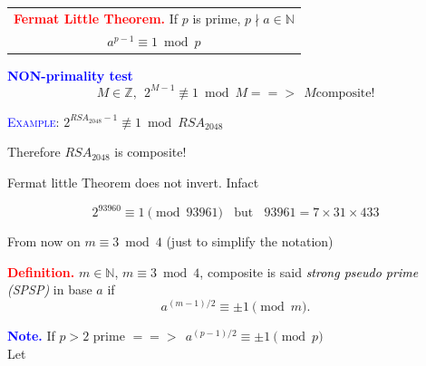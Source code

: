 \documentclass[landscape]{powersem} %
\newcommand{\psd}{\pause}%
\newcommand{\heading}[1]{%
 \begin{center}
  \large\bf
  \Ovalbox{{\textcolor{conceptcolor}{#1}}}%
 \end{center}
 \vspace{1ex minus 1ex}}
\begin{document}

\begin{slide}
\heading{\textsl{B.} Primality test}\psd


\begin{center}
\begin{tabular}{|c|}
\hline \textbf{\textcolor{red}{Fermat Little Theorem.}} If $p$ is prime, $p\nmid a\in{\mathbb N}$\\
$a^{p-1}\equiv1\bmod p$
\\\hline\end{tabular}
\end{center}\psd
\bigskip

\textbf{\textcolor{blue}{NON-primality test}}
$$M\in{\mathbb Z},\ \ 2^{M-1}\not\equiv 1\bmod M =\!\!\!=\!\!\!>\ \  M \textrm{composite!}$$\psd

\textsc{\textcolor{blue}{Example}:} $2^{RSA_{2048}-1}\not\equiv1\bmod RSA_{2048}$\\
\centerline{Therefore $RSA_{2048}$ is composite!}\psd

Fermat little Theorem does not invert. Infact\psd

$$2^{93960}\equiv 1\pmod{93961}\ \ \ \ \textrm{but}\ \ \ \ 93961
=7\times31\times433$$
 \end{slide}


\begin{slide}
\heading{Strong pseudo primes}\psd

From now on $m\equiv3\bmod4$ (just to simplify the notation)\psd

{\textbf{\textcolor{red}{Definition.}}} $m\in\mathbb N$,
$m\equiv3\bmod4$, composite is said \emph{\textcolor{black}{strong pseudo prime} (SPSP)} in base $a$ if
$$a^{(m-1)/2}\equiv \pm1\pmod{m}.$$\psd

\textbf{\textcolor{blue}{Note.}} If $p>2$ prime $=\!\!\!=\!\!\!>\ \ a^{(p-1)/2}\equiv \pm1\pmod{p}$\\
Let %
\psd %
\end{slide}
\end{document}
